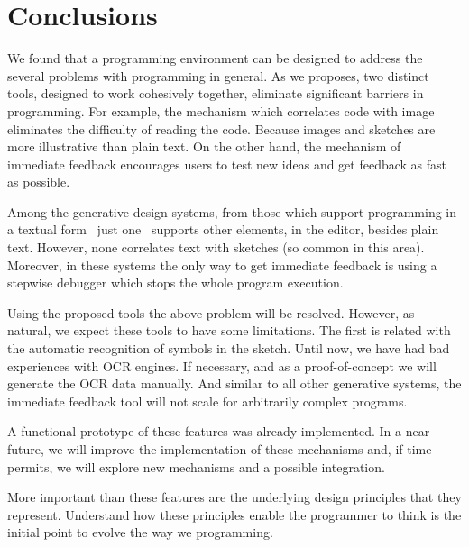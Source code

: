 
% 
% 

\section{Conclusions}
\label{sec:fin}

We found that a programming environment can be designed to address the several problems with programming in general. As we proposes, two distinct tools, designed to work cohesively together, eliminate significant barriers in programming. For example, the mechanism which correlates code with image eliminates the difficulty of reading the code. Because images and sketches are more illustrative than plain text. On the other hand, the mechanism of immediate feedback encourages users to test new ideas and get feedback as fast as possible.

Among the generative design systems, from those which support programming in a textual form~\cite{aish2012designscript,lopes2011portable} just one~\cite{lopes2011portable} supports other elements, in the editor, besides plain text. However, none correlates text with sketches (so common in this area). Moreover, in these systems the only way to get immediate feedback is using a stepwise debugger which stops the whole program execution.

Using the proposed tools the above problem will be resolved. However, as natural, we expect these tools to have some limitations. The first is related with the automatic recognition of symbols in the sketch. Until now, we have had bad experiences with OCR engines. If necessary, and as a proof-of-concept we will generate the OCR data manually. And similar to all other generative systems, the immediate feedback tool will not scale for arbitrarily complex programs.

A functional prototype of these features was already implemented. In a near future, we will improve the implementation of these mechanisms and, if time permits, we will explore new mechanisms and a possible integration.

More important than these features are the underlying design principles that they represent. Understand how these principles enable the programmer to think is the initial point to evolve the way we programming.
